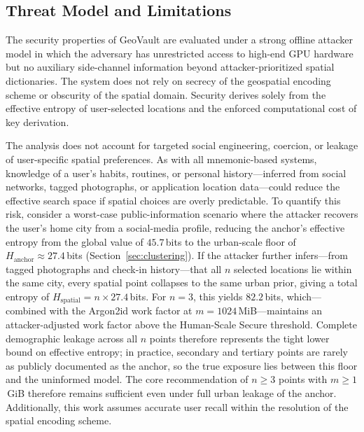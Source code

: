 \documentclass[mathematics,article,accept,pdftex,moreauthors]{Definitions/mdpi}
\begin{document}
\subsection{Threat Model and Limitations}

The security properties of GeoVault are evaluated under a strong offline attacker model in which the adversary has unrestricted access to high-end GPU hardware but no auxiliary side-channel information beyond attacker-prioritized spatial dictionaries. The system does not rely on secrecy of the geospatial encoding scheme or obscurity of the spatial domain. Security derives solely from the effective entropy of user-selected locations and the enforced computational cost of key derivation.

The analysis does not account for targeted social engineering, coercion, or leakage of user-specific spatial preferences. As with all mnemonic-based systems, knowledge of a user's habits, routines, or personal history---inferred from social networks, tagged photographs, or application location data---could reduce the effective search space if spatial choices are overly predictable. {To quantify this risk, consider a worst-case public-information scenario where the attacker recovers the user's home city from a social-media profile, reducing the anchor's effective entropy from the global value of $45.7$\,bits to the urban-scale floor of $H_\text{anchor}\approx 27.4$\,bits (Section~\ref{sec:clustering}). If the attacker further infers---from tagged photographs and check-in history---that all $n$ selected locations lie within the same city, every spatial point collapses to the same urban prior, giving a total entropy of $H_\text{spatial} = n\times 27.4$\,bits. For $n=3$, this yields $82.2$\,bits, which---combined with the Argon2id work factor at $m=1024$\,MiB---maintains an attacker-adjusted work factor above the Human-Scale Secure threshold. Complete demographic leakage across all $n$ points therefore represents the tight lower bound on effective entropy; in practice, secondary and tertiary points are rarely as publicly documented as the anchor, so the true exposure lies between this floor and the uninformed model. The core recommendation of $n\geq 3$ points with $m\geq 1$\,GiB therefore remains sufficient even under full urban leakage of the anchor.} Additionally, this work assumes accurate user recall within the resolution of the spatial encoding scheme. %
\end{document}
